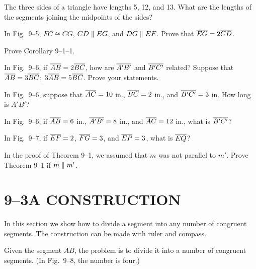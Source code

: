 \documentclass[11pt]{book}
\begin{document}
\begin{exercisecols}
\begin{exlist}
\item The three sides of a triangle have lengths 5, 12, and 13. What are the
      lengths of the segments joining the midpoints of the sides?
\item In Fig.~9--5, $FC \cong CG$, $CD \mathrel{\|} EG$, and $DG \mathrel{\|} EF$. Prove that
      $\overline{EG} = 2\overline{CD}$.
\exfig{\FIGIXFIVE}
\item Prove Corollary 9--1--1.
\item In Fig.~9--6, if $\overline{AB} = 2\overline{BC}$, how are $\overline{A'B'}$ and
      $\overline{B'C'}$ related? Suppose that $\overline{AB} = 3\overline{BC}$; $3\overline{AB} =
      5\overline{BC}$. Prove your statements.
\exfig{\FIGIXSIX}
\item In Fig.~9--6, suppose that $\overline{AC} = 10$ in., $\overline{BC} = 2$ in., and
      $\overline{B'C'} = 3$ in. How long is $A'B'$?
\item In Fig.~9--6, if $\overline{AB} = 6$ in., $\overline{A'B'} = 8$ in., and $\overline{AC} =
      12$ in., what is $\overline{B'C'}$?
\item In Fig.~9--7, if $\overline{EF} = 2$, $\overline{FG} = 3$, and $\overline{EP} = 3$, what is
      $\overline{EQ}$?
\exfig{\FIGIXSEVEN}
\item In the proof of Theorem 9--1, we assumed that $m$ was not parallel to
      $m'$. Prove Theorem 9--1 if $m \mathrel{\|} m'$.
\end{exlist}
\end{exercisecols}

\section*{9--3\quad A CONSTRUCTION}

In this section we show how to divide a segment into any number of congruent
segments. The construction can be made with ruler and compass.

\FIGIXEIGHT

\begin{construction}
Given the segment $AB$, the problem is to divide it into a number of congruent
segments. (In Fig.~9--8, the number is four.)
\end{construction}

\begin{steps}
\end{steps}
\end{document}
